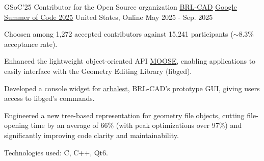 

\begin{cventries}

  \cventry
    {GSoC'25 Contributor for the Open Source organization \underline{\href{https://github.com/BRL-CAD/brlcad}{BRL-CAD}}} %
    {\underline{\href{https://summerofcode.withgoogle.com/programs/2025/projects/25f08iuM}{Google Summer of Code 2025}}} %
    {United States, Online} %
    {May 2025 - Sep. 2025} %
    {
      \begin{cvitems} %
        \item {Choosen among 1,272 accepted contributors against 15,241 participants ($\sim$8.3\% acceptance rate).}
        \item {Enhanced the lightweight object-oriented API \underline{\href{https://github.com/BRL-CAD/MOOSE}{MOOSE}}, enabling applications to easily interface with the Geometry Editing Library (libged).}
        \item {Developed a console widget for \underline{\href{https://github.com/BRL-CAD/arbalest}{arbalest}}, BRL-CAD's prototype GUI, giving users access to libged's commands.}
        \item {Engineered a new tree-based representation for geometry file objects, cutting file-opening time by an average of 66\% (with peak optimizations over 97\%) and significantly improving code clarity and maintainability.}
        \item {Technologies used: C, C++, Qt6.}
      \end{cvitems}
    }

\end{cventries}
